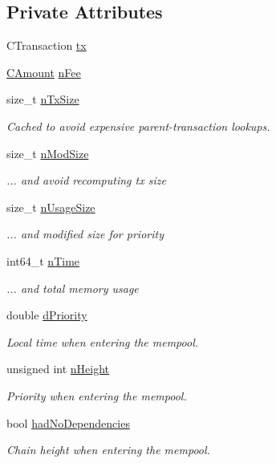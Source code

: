 \subsection*{Private Attributes}
\begin{DoxyCompactItemize}
\item 
C\+Transaction \mbox{\hyperlink{class_c_tx_mem_pool_entry_a8b320073dcb7010fbd19b100c8e13e57}{tx}}
\item 
\mbox{\hyperlink{amount_8h_a4eaf3a5239714d8c45b851527f7cb564}{C\+Amount}} \mbox{\hyperlink{class_c_tx_mem_pool_entry_afdeeb2a36948b64dfa391e214e99e12e}{n\+Fee}}
\item 
size\+\_\+t \mbox{\hyperlink{class_c_tx_mem_pool_entry_a25fcb552777ae6f36df9de3f4c23bad3}{n\+Tx\+Size}}
\begin{DoxyCompactList}\small\item\em Cached to avoid expensive parent-\/transaction lookups. \end{DoxyCompactList}\item 
size\+\_\+t \mbox{\hyperlink{class_c_tx_mem_pool_entry_af543eb39d3cb3f5bbf8244f19f22ee28}{n\+Mod\+Size}}
\begin{DoxyCompactList}\small\item\em ... and avoid recomputing tx size \end{DoxyCompactList}\item 
size\+\_\+t \mbox{\hyperlink{class_c_tx_mem_pool_entry_a46110a49dc627ae6c08e5710f1e038cb}{n\+Usage\+Size}}
\begin{DoxyCompactList}\small\item\em ... and modified size for priority \end{DoxyCompactList}\item 
int64\+\_\+t \mbox{\hyperlink{class_c_tx_mem_pool_entry_a50519989258aefe31a7687feefa06022}{n\+Time}}
\begin{DoxyCompactList}\small\item\em ... and total memory usage \end{DoxyCompactList}\item 
double \mbox{\hyperlink{class_c_tx_mem_pool_entry_a4d7b12ccb464bc49883a8d3db4b4b26f}{d\+Priority}}
\begin{DoxyCompactList}\small\item\em Local time when entering the mempool. \end{DoxyCompactList}\item 
unsigned int \mbox{\hyperlink{class_c_tx_mem_pool_entry_a9cf8cf0f447dcc47de2f49131545214d}{n\+Height}}
\begin{DoxyCompactList}\small\item\em Priority when entering the mempool. \end{DoxyCompactList}\item 
bool \mbox{\hyperlink{class_c_tx_mem_pool_entry_a8bde22b2cd543dde524893bb001e14de}{had\+No\+Dependencies}}
\begin{DoxyCompactList}\small\item\em Chain height when entering the mempool. \end{DoxyCompactList}\end{DoxyCompactItemize}


